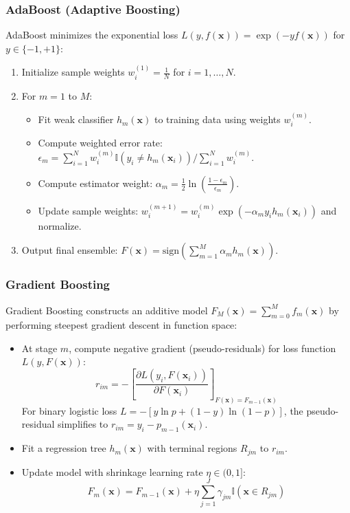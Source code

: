 \documentclass[12pt,a4paper]{article}
\begin{document}
\subsubsection{AdaBoost (Adaptive Boosting)}
AdaBoost minimizes the exponential loss $L(y, f(\mathbf{x})) = \exp(-y f(\mathbf{x}))$ for $y \in \{-1, +1\}$:
\begin{enumerate}
\item Initialize sample weights $w_i^{(1)} = \frac{1}{N}$ for $i=1, \dots, N$.
\item For $m=1$ to $M$:
\begin{itemize}
\item Fit weak classifier $h_m(\mathbf{x})$ to training data using weights $w_i^{(m)}$.
\item Compute weighted error rate: $\epsilon_m = \sum_{i=1}^N w_i^{(m)} \mathbb{I}(y_i \neq h_m(\mathbf{x}_i)) / \sum_{i=1}^N w_i^{(m)}$.
\item Compute estimator weight: $\alpha_m = \frac{1}{2} \ln\left( \frac{1-\epsilon_m}{\epsilon_m} \right)$.
\item Update sample weights: $w_i^{(m+1)} = w_i^{(m)} \exp\left( -\alpha_m y_i h_m(\mathbf{x}_i) \right)$ and normalize.
\end{itemize}
\item Output final ensemble: $F(\mathbf{x}) = \text{sign}\left( \sum_{m=1}^M \alpha_m h_m(\mathbf{x}) \right)$.
\end{enumerate}

\subsubsection{Gradient Boosting}
Gradient Boosting constructs an additive model $F_M(\mathbf{x}) = \sum_{m=0}^M f_m(\mathbf{x})$ by performing steepest gradient descent in function space:
\begin{itemize}
\item At stage $m$, compute negative gradient (pseudo-residuals) for loss function $L(y, F(\mathbf{x}))$:
\begin{equation}
r_{im} = -\left[ \frac{\partial L(y_i, F(\mathbf{x}_i))}{\partial F(\mathbf{x}_i)} \right]_{F(\mathbf{x}) = F_{m-1}(\mathbf{x})}
\end{equation}
For binary logistic loss $L = -[y \ln p + (1-y)\ln(1-p)]$, the pseudo-residual simplifies to $r_{im} = y_i - p_{m-1}(\mathbf{x}_i)$.
\item Fit a regression tree $h_m(\mathbf{x})$ with terminal regions $R_{jm}$ to $r_{im}$.
\item Update model with shrinkage learning rate $\eta \in (0, 1]$:
\begin{equation}
F_m(\mathbf{x}) = F_{m-1}(\mathbf{x}) + \eta \sum_{j=1}^{J} \gamma_{jm} \mathbb{I}(\mathbf{x} \in R_{jm})
\end{equation}
\end{itemize}
\end{document}
